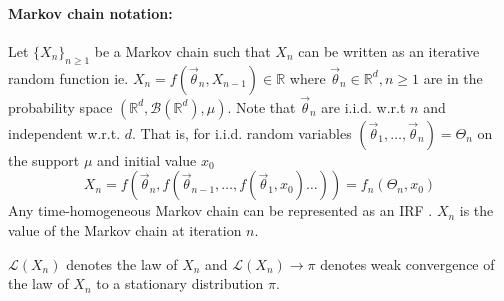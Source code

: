 \documentclass[12pt]{article}
\theoremstyle{plain}%
\theoremstyle{definition}
\begin{document}
\paragraph{Markov chain notation:}Let $\{X_n\}_{n\geq 1}$ be a Markov chain such that $X_n$ can be written as an iterative random function ie. $X_n=f(\vec{\theta}_n,X_{n-1})\in \mathbb{R}$ where $\vec{\theta}_n\in\mathbb{R}^d, n\geq 1$ are in the probability space $(\mathbb{R}^d, \mathcal{B}(\mathbb{R}^d), \mu)$. Note that $\vec{\theta}_n$ are i.i.d. w.r.t $n$ and independent w.r.t. $d$. That is, for i.i.d. random variables $(\vec{\theta}_1,\ldots, \vec{\theta}_n)=\Theta_n$ on the support $\mu$ and initial value $x_0$
\begin{equation}\label{eq:forward}
 X_n=f(\vec{\theta}_n,f(\vec{\theta}_{n-1},\ldots, f(\vec{\theta}_1,x_0)\ldots ))=f_n(\Theta_n,x_0)
\end{equation} 
Any time-homogeneous Markov chain can be represented as an IRF \cite{avcont}. $X_n$ is the value of the Markov chain at iteration $n$.

%


$\mathcal{L}(X_n)$ denotes the law of $X_n$ and $\mathcal{L}(X_n)\to\pi$ denotes weak convergence of the law of $X_n$ to a stationary distribution $\pi$.
\end{document}
